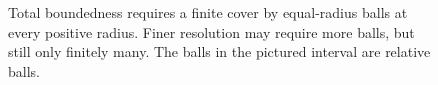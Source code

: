 \begin{figure}[H]
\centering
{}
\caption{Total boundedness requires a finite cover by equal-radius balls at every positive radius. Finer resolution may require more balls, but still only finitely many. The balls in the pictured interval are relative balls.}
\label{fig:compact-scales}
\end{figure}
